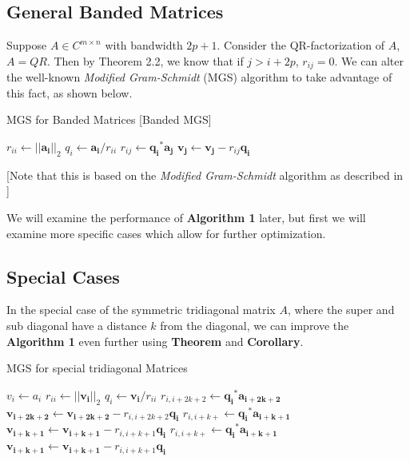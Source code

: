 \documentclass{article}
\numberwithin{pic}{section}
\numberwithin{lem}{section}
\numberwithin{thm}{section}
\numberwithin{cor}{section}
\theoremstyle{definition}
\numberwithin{ex}{section}
\numberwithin{defn}{section}
\theoremstyle{definition}
\theoremstyle{remark}
\newcommand{\set}[1]{\ensuremath{\left\{ #1\right\}}} %
\newcommand{\norm}[1]{\ensuremath{\left | \left | #1 \right | \right |}}
\newlength\tindent
\renewcommand{\indent}{\hspace*{\tindent}}
\begin{document}
\subsection{General Banded Matrices}
\indent Suppose $A\in C^{m\times n}$ with bandwidth $2p +1$. Consider the QR-factorization
of $A$, $A = QR$. Then by Theorem 2.2, we
know that if $j > i + 2p$, $r_{ij} = 0$. We can alter the well-known
\textit{Modified Gram-Schmidt} (MGS) algorithm to take advantage of this fact,
as shown below.
\begin{algorithm}[H]
  \caption{MGS for Banded Matrices [Banded MGS]}
  \begin{algorithmic}[1]
    \State$r_{ii}\gets \norm{\mathbf{a_i}}_2$
    \State$q_i\gets \mathbf{a_i} / r_{ii}$
    \For{$j = i + 1$\textbf{ to }$\text{min}\set{i + 2p, n}$}
    \State$r_{ij}\gets \mathbf{q_i}^*\mathbf{a_j}$
    \State$\mathbf{v_j}\gets\mathbf{v_j} - r_{ij}\mathbf{q_i}$
    \EndFor
    \EndFor
  \end{algorithmic}
  [Note that this is based on the \textit{Modified
    Gram-Schmidt} algorithm as described in \cite{nla}] 
\end{algorithm}
\indent We will examine the performance of \textbf{Algorithm 1} later, but first we will
examine more specific cases which allow for further optimization.
\subsection{Special Cases}
\indent In the special case of the symmetric tridiagonal matrix $A$, where the super and sub diagonal have a distance $k$ from the diagonal, we can improve the \textbf{Algorithm 1} even further using \textbf{Theorem} and \textbf{Corollary}.
\begin{algorithm}[H]
  \caption{MGS for special tridiagonal Matrices }
  \begin{algorithmic}[1]
   	\State$v_i\gets a_i$
    \EndFor
    \State$r_{ii}\gets \norm{\mathbf{v_i}}_2$
    \State$q_i\gets \mathbf{v_i} / r_{ii}$ 
    	\State$r_{i,i+2k+2}\gets \mathbf{q_i}^*\mathbf{a_{i+2k+2}}$
    	\State$\mathbf{v_{i+2k+2}}\gets\mathbf{v_{i+2k+2}} - r_{i,i+2k+2}\mathbf{q_i}$
    	\State$r_{i,i+k+}\gets \mathbf{q_i}^*\mathbf{a_{i+k+1}}$
    	\State$\mathbf{v_{i+k+1}}\gets\mathbf{v_{i+k+1}} - r_{i,i+k+1}\mathbf{q_i}$
    	\State$r_{i,i+k+}\gets \mathbf{q_i}^*\mathbf{a_{i+k+1}}$
    	\State$\mathbf{v_{i+k+1}}\gets\mathbf{v_{i+k+1}} - r_{i,i+k+1}\mathbf{q_i}$
       	\EndIf
    \EndFor
  \end{algorithmic}
\end{algorithm}
\end{document}
